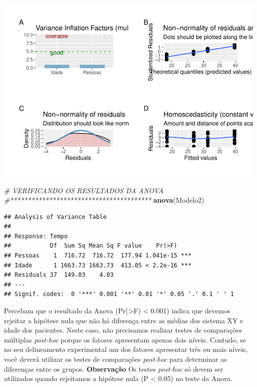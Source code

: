 \documentclass[
]{book}
\newenvironment{Shaded}{\begin{snugshade}}{\end{snugshade}}
\newcommand{\CommentTok}[1]{\textcolor[rgb]{0.56,0.35,0.01}{\textit{#1}}}
\newcommand{\KeywordTok}[1]{\textcolor[rgb]{0.13,0.29,0.53}{\textbf{#1}}}
\newcommand{\NormalTok}[1]{#1}
\begin{document}
\includegraphics{livro_r_ecologia_files/figure-latex/unnamed-chunk-16-1.pdf}

\begin{Shaded}
\begin{Highlighting}[]
\CommentTok{# VERIFICANDO OS RESULTADOS DA ANOVA}
\CommentTok{#****************************************}
\KeywordTok{anova}\NormalTok{(Modelo2)}
\end{Highlighting}
\end{Shaded}

\begin{verbatim}
## Analysis of Variance Table
## 
## Response: Tempo
##           Df  Sum Sq Mean Sq F value    Pr(>F)    
## Pessoas    1  716.72  716.72  177.94 1.041e-15 ***
## Idade      1 1663.73 1663.73  413.05 < 2.2e-16 ***
## Residuals 37  149.03    4.03                      
## ---
## Signif. codes:  0 '***' 0.001 '**' 0.01 '*' 0.05 '.' 0.1 ' ' 1
\end{verbatim}

Percebam que o resultado da Anova (Pr(\textgreater F) \textless{} 0.001) indica que devemos rejeitar a hipótese nula que não há diferença entre as médias dos sistema XY e idade dos pacientes. Neste caso, não precisamos realizar testes de comparações múltiplas \emph{post-hoc} porque os fatores apresentam apenas dois níveis. Contudo, se no seu delineamento experimental um dos fatores apresentar três ou mais níveis, você deverá utilizar os testes de comparações \emph{post-hoc} para determinar as diferenças entre os grupos. \textbf{Observação} Os testes \emph{post-hoc} só devem ser utilizados quando rejeitamos a hipótese nula (P \textless{} 0.05) no teste da Anova.
\end{document}
